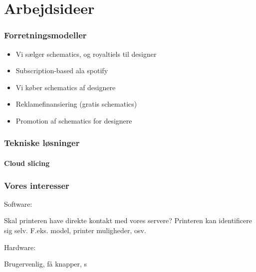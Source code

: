 \chapter{Arbejdsideer} %
\label{cha:arbejdsideer}

\subsection{Forretningsmodeller} %
\label{sub:forretningsmodeller}

\begin{itemize}
	\item Vi sælger schematics, og royaltiels til designer
	\item Subscription-based ala spotify
	\item Vi køber schematics af designere
	\item Reklamefinansiering (gratis schematics)
	\item Promotion af schematics for designere
\end{itemize}


\subsection{Tekniske løsninger} %
\label{sub:tekniske_l_sninger}

\subsubsection{Cloud slicing} %
\label{sub:cloud-slicing}





\subsection{Vores interesser} %
\label{sub:vores_interesser}

Software:

Skal printeren have direkte kontakt med vores servere?
Printeren kan identificere sig selv. F.eks. model, printer muligheder, osv.

Hardware:

Brugervenlig, få knapper, s


